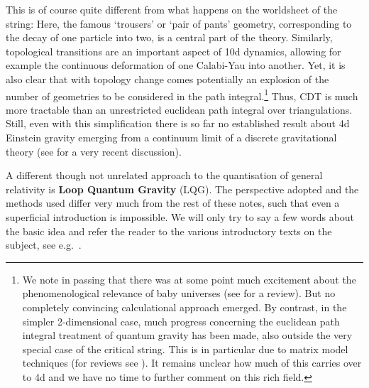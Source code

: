 \documentclass[12pt]{article}
\numberwithin{equation}{section}
\begin{document}
This is of course quite different from what happens on the worldsheet of the string: Here, the famous `trousers' or `pair of pants' geometry, corresponding to the decay of one particle into two, is a central part of the theory. Similarly, topological transitions are an important aspect of 10d dynamics, allowing for example the continuous deformation of one Calabi-Yau into another. Yet, it is also clear that with topology change comes potentially an explosion of the number of geometries to be considered in the path integral.\footnote{
We note in passing that there was at some point much excitement about the phenomenological relevance of baby universes \cite{Giddings:1987cg, Coleman:1988tj} (see \cite{Hebecker:2018ofv} for a review). But no completely convincing calculational approach emerged. By contrast, in the simpler 2-dimensional case, much progress concerning the euclidean path integral treatment of quantum gravity has been made, also outside the very special case of the critical string. This is in particular due to matrix model techniques \cite{Kazakov:1985ea, Ambjorn:1985az, David:1984tx} (for reviews see \cite{Klebanov:1991qa, Ginsparg:1993is}). It remains unclear how much of this carries over to 4d and we have no time to further comment on this rich field.
}
Thus, CDT is much more tractable than an unrestricted euclidean path integral over triangulations.
Still, even with this simplification there is so far no established result about 4d Einstein gravity emerging from a continuum limit of a discrete gravitational theory (see \cite{Ambjorn:2020rcn} for a very recent discussion).

A different though not unrelated approach to the quantisation of general relativity is {\bf Loop Quantum Gravity} (LQG). The perspective adopted and the methods used differ very much from the rest of these notes, such that even a superficial introduction is impossible. We will only try to say a few words about the basic idea and refer the reader to the various introductory texts on the subject, see e.g.~\cite{Thiemann:2002nj, Nicolai:2005mc, Nicolai:2006id, Ashtekar:2007tv, Dona:2010hm,  Rovelli:2011eq, Rovelli:2014ssa}.
\end{document}

